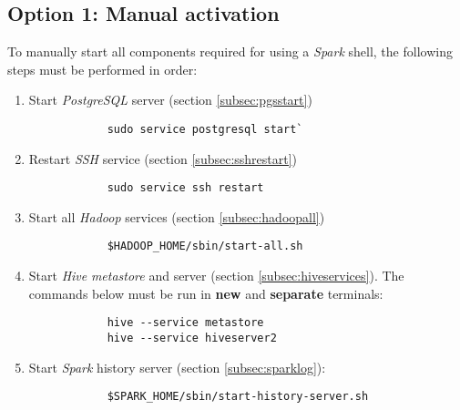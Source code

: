 \documentclass{article}
\begin{document}
    \subsection{Option 1: Manual activation}
    To manually start all components required for using a \emph{Spark} shell, the following steps
    must be performed in order:
    \begin{enumerate}
        \item Start \emph{PostgreSQL} server (section \ref{subsec:pgsstart})
        \begin{verbatim}
            sudo service postgresql start`
        \end{verbatim}

        \item Restart \emph{SSH} service (section \ref{subsec:sshrestart})
        \begin{verbatim}
            sudo service ssh restart
        \end{verbatim}

        \item Start all \emph{Hadoop} services (section \ref{subsec:hadoopall})
        \begin{verbatim}
            $HADOOP_HOME/sbin/start-all.sh
        \end{verbatim}

        \item Start \emph{Hive} \emph{metastore} and server (section \ref{subsec:hiveservices}).
        The commands below must be run in \textbf{new} and \textbf{separate} terminals:
        \begin{verbatim}
            hive --service metastore
            hive --service hiveserver2
        \end{verbatim}

        \item Start \emph{Spark} history server (section \ref{subsec:sparklog}):
        \begin{verbatim}
            $SPARK_HOME/sbin/start-history-server.sh
        \end{verbatim}
    \end{enumerate}
\end{document}

